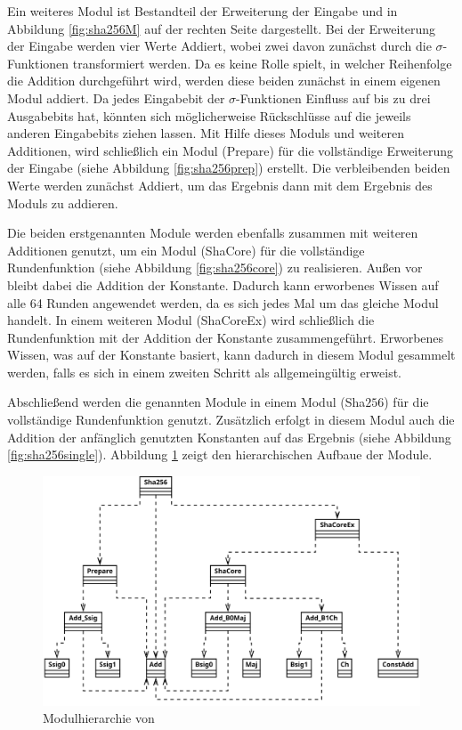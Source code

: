Ein weiteres Modul ist Bestandteil der Erweiterung der Eingabe und in Abbildung \ref{fig:sha256M} auf der rechten Seite
dargestellt. Bei der Erweiterung der Eingabe werden vier Werte Addiert, wobei zwei davon zunächst durch die $ \sigma $-Funktionen
transformiert werden. Da es keine Rolle spielt, in welcher Reihenfolge die Addition durchgeführt wird, werden diese
beiden zunächst in einem eigenen Modul addiert. Da jedes Eingabebit der $ \sigma $-Funktionen Einfluss auf bis zu
drei Ausgabebits hat, könnten sich möglicherweise Rückschlüsse auf die jeweils anderen Eingabebits ziehen lassen.
Mit Hilfe dieses Moduls und weiteren Additionen, wird schließlich ein Modul (Prepare) für die vollständige Erweiterung der Eingabe
(siehe Abbildung \ref{fig:sha256prep}) erstellt. Die verbleibenden beiden Werte werden zunächst Addiert, um das Ergebnis
dann mit dem Ergebnis des Moduls zu addieren.

Die beiden erstgenannten Module werden ebenfalls zusammen mit weiteren Additionen genutzt, um ein Modul (ShaCore) für die vollständige
Rundenfunktion (siehe Abbildung \ref{fig:sha256core}) zu realisieren. Außen vor bleibt dabei die Addition der Konstante.
Dadurch kann erworbenes Wissen auf alle 64 Runden angewendet werden, da es sich jedes Mal um das gleiche Modul handelt.
In einem weiteren Modul (ShaCoreEx) wird schließlich die Rundenfunktion mit der Addition der Konstante zusammengeführt.
Erworbenes Wissen, was auf der Konstante basiert, kann dadurch in diesem Modul gesammelt werden, falls es sich in einem
zweiten Schritt als allgemeingültig erweist.

Abschließend werden die genannten Module in einem Modul (Sha$256$) für die vollständige Rundenfunktion genutzt. Zusätzlich erfolgt in
diesem Modul auch die Addition der anfänglich genutzten Konstanten auf das Ergebnis (siehe Abbildung \ref{fig:sha256single}).
Abbildung \ref{fig:sha256_module} zeigt den hierarchischen Aufbaue der Module.
\begin{figure}[!h]
  \centering
  \includegraphics[scale=0.25]{images/module}
  \caption{Modulhierarchie von }
  \label{fig:sha256_module}
\end{figure}